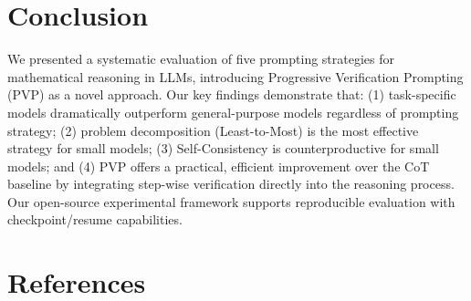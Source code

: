 \documentclass[conference]{IEEEtran}
\begin{document}
\section{Conclusion}

We presented a systematic evaluation of five prompting strategies for mathematical reasoning in LLMs, introducing Progressive Verification Prompting (PVP) as a novel approach. Our key findings demonstrate that: (1) task-specific models dramatically outperform general-purpose models regardless of prompting strategy; (2) problem decomposition (Least-to-Most) is the most effective strategy for small models; (3) Self-Consistency is counterproductive for small models; and (4) PVP offers a practical, efficient improvement over the CoT baseline by integrating step-wise verification directly into the reasoning process. Our open-source experimental framework supports reproducible evaluation with checkpoint/resume capabilities.

\section*{References}
\end{document}
